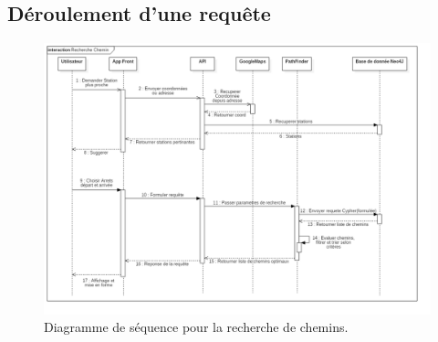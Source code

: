 \subsection{Déroulement d'une requête}
\begin{figure}
	\center
	\includegraphics[width=\textwidth]{img/RechercheChemin.png}
	\caption{Diagramme de séquence pour la recherche de chemins.}
	\label{fig:diagSequence}
\end{figure}

